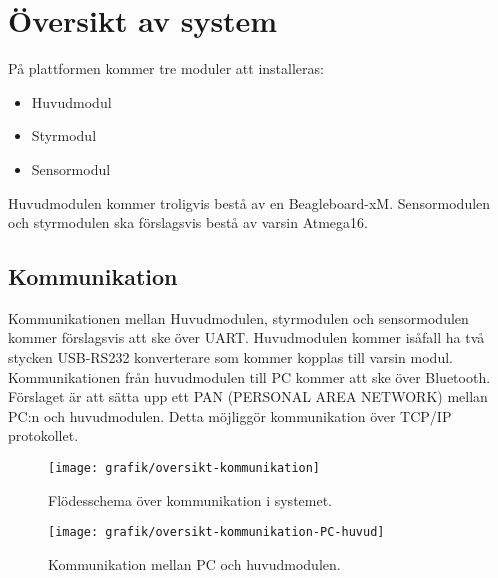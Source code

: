 \section{Översikt av system}
På plattformen kommer tre moduler att installeras:

\begin{itemize}
\item Huvudmodul
\item Styrmodul
\item Sensormodul
\end{itemize}
Huvudmodulen kommer troligvis bestå av en Beagleboard-xM. Sensormodulen och styrmodulen ska förslagsvis bestå av varsin Atmega16.
\subsection{Kommunikation}
Kommunikationen mellan Huvudmodulen, styrmodulen och sensormodulen kommer förslagsvis att ske över UART. Huvudmodulen kommer isåfall ha två stycken USB-RS232 konverterare som kommer kopplas till varsin modul. Kommunikationen från huvudmodulen till PC kommer att ske över Bluetooth. Förslaget är att sätta upp ett PAN (PERSONAL AREA NETWORK) mellan PC:n och huvudmodulen. Detta möjliggör kommunikation över TCP/IP protokollet.

\begin{figure}[h]
\center
\texttt{[image: grafik/oversikt-kommunikation]}
\caption{Flödesschema över kommunikation i systemet.}
\end{figure}

\begin{figure}[h]
\center
\texttt{[image: grafik/oversikt-kommunikation-PC-huvud]}
\caption{Kommunikation mellan PC och huvudmodulen.}
\end{figure}

